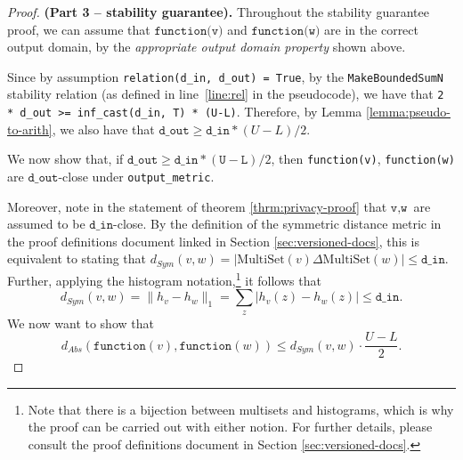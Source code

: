 \documentclass[11pt,a4paper]{article}
\theoremstyle{definition}
\newcommand{\MultiSet}{\mathrm{MultiSet}}
\newcommand{\din}{\texttt{d\_in}}
\newcommand{\dout}{\texttt{d\_out}}
\newcommand{\function}{\texttt{function}}
\begin{document}
    \begin{proof}
    \textbf{(Part 3 -- stability guarantee).} 
    Throughout the stability guarantee proof, we can assume that $\texttt{function(v)}$ and $\texttt{function(w)}$ are in the correct output domain, by the \textit{appropriate output domain property} shown above. 
    
    

    
    Since by assumption \texttt{relation(d\_in, d\_out) = True}, by the \texttt{MakeBoundedSumN} stability relation (as defined in line~\ref{line:rel} in the pseudocode), we have that \texttt{2 *  d\_out >= inf\_cast(d\_in, T) * (U-L)}. Therefore, by Lemma \ref{lemma:pseudo-to-arith}, we also have that $\dout \geq \din * (U-L)/2$.
    
    
    
    We now show that, if $\dout \geq \din * (\texttt{U}-\texttt{L})/2$, then \texttt{function(v)}, \texttt{function(w)} are $\dout$-close under \texttt{output\_metric}.

    
    
    Moreover, note in the statement of theorem \ref{thrm:privacy-proof} that $\texttt{v}, \texttt{w}$ are assumed to be $\din$-close. By the definition of the symmetric distance metric in the proof definitions document linked in Section \ref{sec:versioned-docs}, this is equivalent to stating that $d_{Sym}(v, w) = |\MultiSet(v) \Delta \MultiSet(w)| \leq \din$. Further, applying the histogram notation,\footnote{Note that there is a bijection between multisets and histograms, which is why the proof can be carried out with either notion. For further details, please consult the proof definitions document in Section \ref{sec:versioned-docs}.} it follows that
    \[
        d_{Sym}(v, w) = \lVert h_{v} - h_{w}\rVert_1 = \sum_z |h_v(z) - h_w(z)| \leq \din.
    \]
    We now want to show that
    \[
        d_{Abs}(\function(v), \function(w)) \leq d_{Sym}(v, w) \cdot \dfrac{U-L}{2}.
    \]
    

\end{proof}
\end{document}
